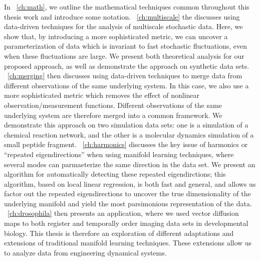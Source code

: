 In \chap~\ref{ch:math}, we outline the mathematical techniques common throughout this thesis work and introduce some notation. 
%
\chap~\ref{ch:multiscale} the discusses using data-driven techniques for the analysis of multiscale stochastic data. 
%
Here, we show that, by introducing a more sophisticated metric, we can uncover a parameterization of data which is invariant to fast stochastic fluctuations, even when these fluctuations are large. 
%
We present both theoretical analysis for our proposed approach, as well as demonstrate the approach on synthetic data sets. 
%
\chap~\ref{ch:merging} then discusses using data-driven techniques to merge data from different observations of the same underlying system. 
%
In this case, we also use a more sophisticated metric which removes the effect of nonlinear observation/measurement functions. 
%
Different observations of the same underlying system are therefore merged into a common framework. 
%
We demonstrate this approach on two simulation data sets: one is a simulation of a chemical reaction network, and the other is a molecular dynamics simulation of a small peptide fragment.
%
\chap~\ref{ch:harmonics} discusses the key issue of harmonics or ``repeated eigendirections'' when using manifold learning techniques, where several modes can parmaeterize the same direction in the data set. 
%
We present an algorithm for automatically detecting these repeated eigendirctions; this algorithm, based on local linear regression, is both fast and general, and allows us factor out the repeated eigendirections to uncover the true dimensionality of the underlying manifold and yield the most parsimonious representation of the data. 
%
\chap~\ref{ch:drosophila} then presents an application, where we used vector diffusion maps to both register and temporally order imaging data sets in developmental biology. 
% 
This thesis is therefore an exploration of different adaptations and extensions of traditional manifold learning techniques. 
%
These extensions allow us to analyze data from engineering dynamical systems. 
